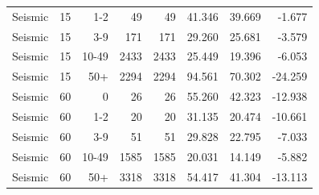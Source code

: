 \begin{longtable}{llrrrrrr}
Seismic & 15 & 1-2 & 49 & 49 & 41.346 & 39.669 & -1.677\\
Seismic & 15 & 3-9 & 171 & 171 & 29.260 & 25.681 & -3.579\\
Seismic & 15 & 10-49 & 2433 & 2433 & 25.449 & 19.396 & -6.053\\
Seismic & 15 & 50+ & 2294 & 2294 & 94.561 & 70.302 & -24.259\\
Seismic & 60 & 0 & 26 & 26 & 55.260 & 42.323 & -12.938\\
Seismic & 60 & 1-2 & 20 & 20 & 31.135 & 20.474 & -10.661\\
Seismic & 60 & 3-9 & 51 & 51 & 29.828 & 22.795 & -7.033\\
Seismic & 60 & 10-49 & 1585 & 1585 & 20.031 & 14.149 & -5.882\\
Seismic & 60 & 50+ & 3318 & 3318 & 54.417 & 41.304 & -13.113\\
\bottomrule\end{longtable}\normalsize